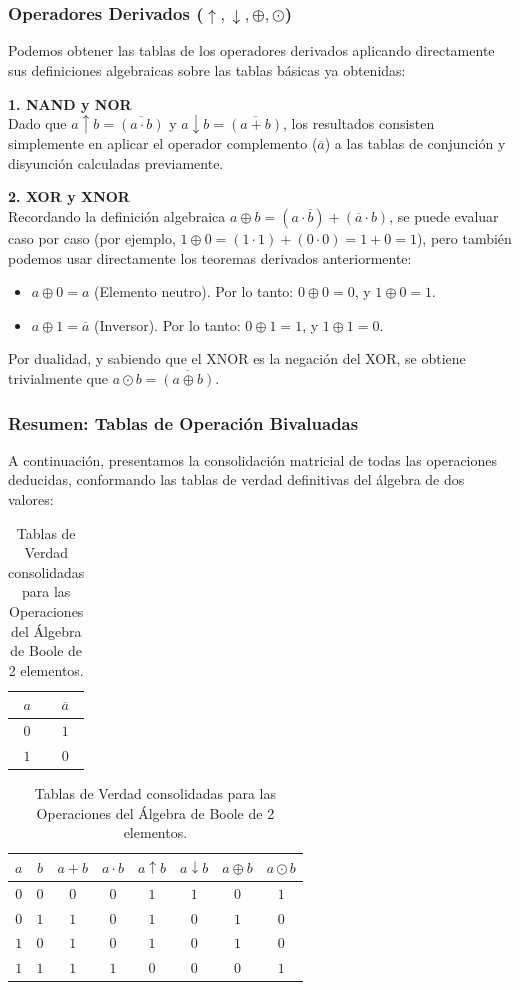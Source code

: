 \subsubsection{Operadores Derivados ($\uparrow, \downarrow, \oplus, \odot$)}
Podemos obtener las tablas de los operadores derivados aplicando directamente sus definiciones algebraicas sobre las tablas básicas ya obtenidas:

\textbf{1. NAND y NOR} \\
Dado que $a \uparrow b = \overline{(a \cdot b)}$ y $a \downarrow b = \overline{(a + b)}$, los resultados consisten simplemente en aplicar el operador complemento ($\overline{a}$) a las tablas de conjunción y disyunción calculadas previamente.

\textbf{2. XOR y XNOR} \\
Recordando la definición algebraica $a \oplus b = (a \cdot \overline{b}) + (\overline{a} \cdot b)$, se puede evaluar caso por caso (por ejemplo, $1 \oplus 0 = (1 \cdot 1) + (0 \cdot 0) = 1 + 0 = 1$), pero también podemos usar directamente los teoremas derivados anteriormente:
\begin{itemize}
    \item $a \oplus 0 = a$ (Elemento neutro). Por lo tanto: $0 \oplus 0 = 0$, y $1 \oplus 0 = 1$.
    \item $a \oplus 1 = \overline{a}$ (Inversor). Por lo tanto: $0 \oplus 1 = 1$, y $1 \oplus 1 = 0$.
\end{itemize}
Por dualidad, y sabiendo que el XNOR es la negación del XOR, se obtiene trivialmente que $a \odot b = \overline{(a \oplus b)}$.

\subsubsection{Resumen: Tablas de Operación Bivaluadas}
A continuación, presentamos la consolidación matricial de todas las operaciones deducidas, conformando las tablas de verdad definitivas del álgebra de dos valores:

\begin{table}[h!]
\centering
\renewcommand{\arraystretch}{1.2}
\begin{tabular}{c||c}
\hline
$a$ & $\overline{a}$ \\
\hline\hline
$0$ & $1$ \\
$1$ & $0$ \\
\hline
\end{tabular}
\qquad
\begin{tabular}{cc||c|c|c|c|c|c}
\hline
$a$ & $b$ & $a + b$ & $a \cdot b$ & $a \uparrow b$ & $a \downarrow b$ & $a \oplus b$ & $a \odot b$ \\
\hline\hline
$0$ & $0$ & $0$ & $0$ & $1$ & $1$ & $0$ & $1$ \\
$0$ & $1$ & $1$ & $0$ & $1$ & $0$ & $1$ & $0$ \\
$1$ & $0$ & $1$ & $0$ & $1$ & $0$ & $1$ & $0$ \\
$1$ & $1$ & $1$ & $1$ & $0$ & $0$ & $0$ & $1$ \\
\hline
\end{tabular}
\caption{Tablas de Verdad consolidadas para las Operaciones del Álgebra de Boole de 2 elementos.}
\label{tab:tablas_bivaluadas}
\end{table}

